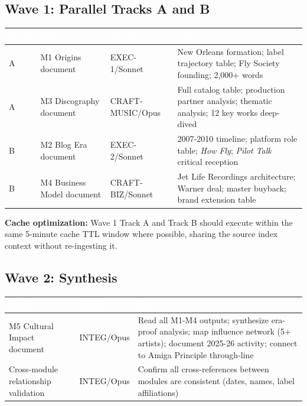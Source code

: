 \documentclass[11pt,letterpaper]{article}
\newcommand{\tableheader}[1]{\textbf{\sffamily\textcolor{white}{#1}}}
\begin{document}
\subsection{Wave 1: Parallel Tracks A and B}

\begin{center}
\begin{tabularx}{\textwidth}{L{2cm}L{3cm}L{2cm}X}
\toprule
{}
\tableheader{Track} & \tableheader{Task} & \tableheader{Agent} & \tableheader{Spec} \\
\midrule
A & M1 Origins document & EXEC-1/Sonnet & New Orleans formation; label trajectory table; Fly Society founding; 2,000+ words \\
A & M3 Discography document & CRAFT-MUSIC/Opus & Full catalog table; production partner analysis; thematic analysis; 12 key works deep-dived \\
B & M2 Blog Era document & EXEC-2/Sonnet & 2007-2010 timeline; platform role table; \textit{How Fly}; \textit{Pilot Talk} critical reception \\
B & M4 Business Model document & CRAFT-BIZ/Sonnet & Jet Life Recordings architecture; Warner deal; master buyback; brand extension table \\
\bottomrule
\end{tabularx}
\end{center}

\textbf{Cache optimization:} Wave 1 Track A and Track B should execute within the same 5-minute cache TTL window where possible, sharing the source index context without re-ingesting it.

\subsection{Wave 2: Synthesis}

\begin{center}
\begin{tabularx}{\textwidth}{L{3cm}L{2cm}X}
\toprule
{}
\tableheader{Task} & \tableheader{Agent} & \tableheader{Spec} \\
\midrule
M5 Cultural Impact document & INTEG/Opus & Read all M1-M4 outputs; synthesize era-proof analysis; map influence network (5+ artists); document 2025-26 activity; connect to Amiga Principle through-line \\
Cross-module relationship validation & INTEG/Opus & Confirm all cross-references between modules are consistent (dates, names, label affiliations) \\
\bottomrule
\end{tabularx}
\end{center}
\end{document}
